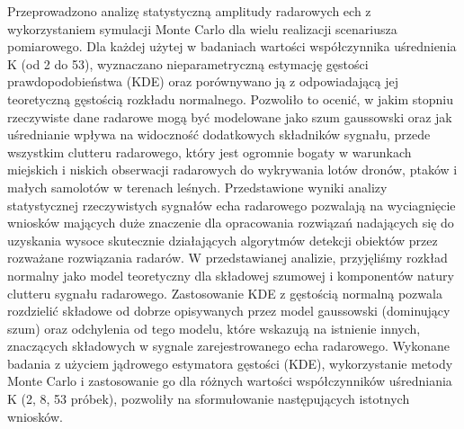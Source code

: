 
Przeprowadzono analizę statystyczną amplitudy radarowych ech z wykorzystaniem symulacji Monte Carlo dla wielu realizacji scenariusza pomiarowego. Dla każdej użytej w badaniach wartości współczynnika uśrednienia K (od 2 do 53), wyznaczano nieparametryczną estymację gęstości prawdopodobieństwa (KDE) oraz porównywano ją z odpowiadającą jej teoretyczną gęstością rozkładu normalnego. Pozwoliło to ocenić, w jakim stopniu rzeczywiste dane radarowe mogą być modelowane jako szum gaussowski oraz jak uśrednianie wpływa na widoczność dodatkowych składników sygnału, przede wszystkim clutteru radarowego, który jest ogromnie bogaty w warunkach miejskich i niskich obserwacji radarowych do wykrywania lotów dronów, ptaków i małych samolotów w terenach leśnych. Przedstawione wyniki analizy statystycznej rzeczywistych sygnałów echa radarowego pozwalają na wyciagnięcie wniosków mających duże znaczenie dla opracowania rozwiązań nadających się do uzyskania wysoce skutecznie działających algorytmów detekcji obiektów przez rozważane rozwiązania radarów. W przedstawianej analizie, przyjęliśmy rozkład normalny jako model teoretyczny dla składowej szumowej i komponentów natury clutteru sygnału radarowego. Zastosowanie KDE z gęstością normalną pozwala rozdzielić składowe od dobrze opisywanych przez model gaussowski (dominujący szum) oraz odchylenia od tego modelu, które wskazują na istnienie innych, znaczących składowych w sygnale zarejestrowanego echa radarowego. Wykonane badania z użyciem jądrowego estymatora gęstości (KDE), wykorzystanie metody Monte Carlo i zastosowanie go dla różnych wartości współczynników uśredniania K (2, 8, 53 próbek), pozwoliły na sformułowanie następujących istotnych wniosków. 
